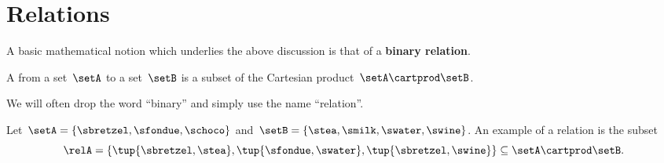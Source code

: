 
\section{Relations}
\label{sec:connection-relations}
A basic mathematical notion which underlies the above discussion is that of a \textbf{binary relation}.

\begin{ctdefinition}
	\label{def:binary-relation}
	A \emph{} from a set~$\setA$ to a set~$\setB$ is a subset of the Cartesian product~$\setA\cartprod \setB$.
\end{ctdefinition}

\begin{remark}
	We will often drop the word ``binary'' and simply use the name ``relation''.
\end{remark}

\begin{marginfigure}
	\centering
	\caption{}
	\label{fig:example_rel}
\end{marginfigure}

\begin{example}
	\label{exa:simple-rel}
	Let~$\setA = \{ \sbretzel, \sfondue, \schoco \}$ and~$\setB = \{ \stea, \smilk, \swater, \swine \}$.
	An example of a relation is the subset
	\begin{equation}
		\relA = \{ \tup{\sbretzel, \stea}, \tup{\sfondue, \swater}, \tup{\sbretzel, \swine} \} \subseteq \setA \cartprod \setB.
	\end{equation}
\end{example}

